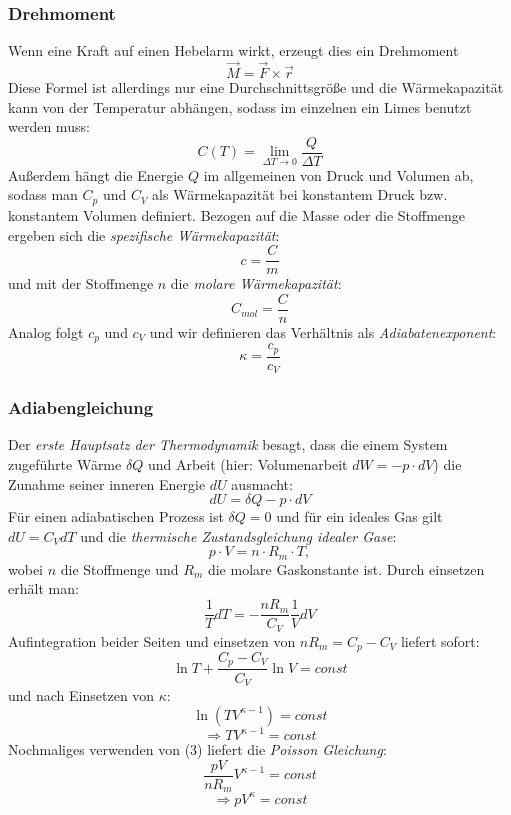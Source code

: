 \documentclass[%
   final,      %
   paper=a4, paper=portrait, pagesize=auto, %
   fontsize=11pt, %
   ngerman, %
 ]{scrartcl} %
\begin{document}
\subsubsection{Drehmoment}
Wenn eine Kraft auf einen Hebelarm wirkt, erzeugt dies ein Drehmoment
\begin{equation}
\vec{M}=\vec{F}\times\vec{r}
\end{equation}
Diese Formel ist allerdings nur eine Durchschnittsgröße und die Wärmekapazität kann von der Temperatur abhängen, sodass im einzelnen ein Limes benutzt werden muss:
\begin{equation}
\nonumber
C(T) = \lim\limits_{\Delta T \rightarrow 0} \frac{Q}{\Delta T}
\end{equation}
Außerdem hängt die Energie $Q$ im allgemeinen von Druck und Volumen ab, sodass man $C_p$ und $C_V$ als Wärmekapazität bei konstantem Druck bzw. konstantem Volumen definiert. Bezogen auf die Masse oder die Stoffmenge ergeben sich die \emph{spezifische Wärmekapazität}:
\begin{equation}
\nonumber
c = \frac{C}{m}
\end{equation}
und mit der Stoffmenge $n$ die \emph{molare Wärmekapazität}:
\begin{equation}
\nonumber
C_{mol} = \frac{C}{n} 
\end{equation}
Analog folgt $c_p$ und $c_V$ und wir definieren das Verhältnis als \emph{Adiabatenexponent}:
\begin{equation}
\kappa = \frac{c_p}{c_V}
\end{equation}
\subsubsection{Adiabengleichung}
Der \emph{erste Hauptsatz der Thermodynamik} besagt, dass die einem System zugeführte Wärme $\delta Q$ und Arbeit (hier: Volumenarbeit $dW = -p\cdot dV$) die Zunahme seiner inneren Energie $dU$ ausmacht:
\begin{equation}
dU = \delta Q - p\cdot dV 
\end{equation}
Für einen adiabatischen Prozess ist $\delta Q = 0$ und für ein ideales Gas gilt $dU = C_V dT$ und die \emph{thermische Zustandsgleichung idealer Gase}:
\begin{equation}
p\cdot V = n\cdot R_m\cdot T,
\end{equation}
wobei $n$ die Stoffmenge und $R_m$ die molare Gaskonstante ist.
Durch einsetzen erhält man:
\begin{equation}
\nonumber
\frac{1}{T}dT = -\frac{nR_m}{C_V}\frac{1}{V}dV
\end{equation}
Aufintegration beider Seiten und einsetzen von $nR_m = C_p - C_V$ liefert sofort:
\begin{equation}\nonumber
\ln T + \frac{C_p - C_V}{C_V}\ln V = const
\end{equation}
und nach Einsetzen von $\kappa$:
\[
\ln (TV^{\kappa - 1}) = const\]
\[\Longrightarrow TV^{\kappa - 1} = const\]
Nochmaliges verwenden von (3) liefert die \emph{Poisson Gleichung}:
\[\frac{pV}{nR_m}V^{\kappa-1}=const\]
\begin{equation}
\Longrightarrow pV^\kappa = const
\end{equation}
\end{document}
